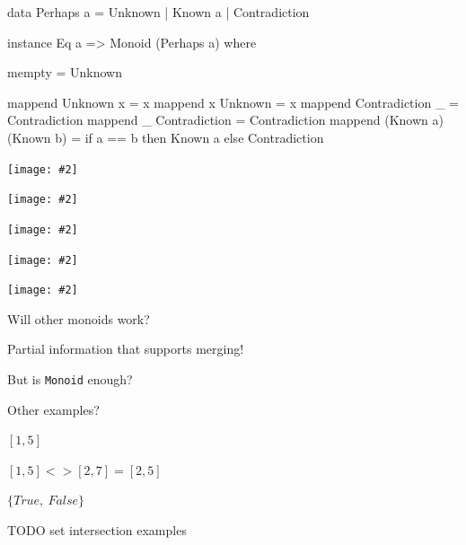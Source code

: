 \documentclass[usenames,dvipsnames,svgnames,table,aspectratio=1610,mathserif]{beamer}
\newcommand{\nl}{\vspace{\baselineskip}}
\newcommand{\pnl}{\pause \nl}
\newcommand{\textslide}[1]{{
\begin{frame}\begin{center}

#1

\end{center}\end{frame}
}}
\newcommand{\imageslide}[2][1]{{
\begin{frame}\begin{center}
\texttt{[image: \#2]}
\end{center}\end{frame}
}}
\newcommand{\imageslideleft}[2][1]{{
\begin{frame}
\texttt{[image: \#2]}
\end{frame}
}}
\begin{document}

\begin{frame}[fragile]

\begin{haskellcode}
data Perhaps a = Unknown | Known a | Contradiction
\end{haskellcode}

\pnl

\begin{haskellcode}
instance Eq a => Monoid (Perhaps a) where

  mempty = Unknown

  mappend Unknown x           = x
  mappend x       Unknown     = x
  mappend Contradiction _     = Contradiction
  mappend _     Contradiction = Contradiction
  mappend (Known a) (Known b) =
    if a == b
      then Known a
      else Contradiction
\end{haskellcode}

\end{frame}



\imageslide[0.6]{diagrams/doubleplus4.pdf}
\imageslide[0.6]{diagrams/doubleplus5.pdf}
\imageslide[0.6]{diagrams/doubleplus6.pdf}
\imageslide[0.6]{diagrams/doubleplus7.pdf}
\imageslide[0.6]{diagrams/doubleplus8.pdf}

\textslide{\LARGE{Will other monoids work?}}


\textslide{
{\LARGE Partial information that supports merging!}

\pnl

But is {\tt Monoid} enough?
}



\textslide{\LARGE Other examples?}

\begin{frame}
\begin{center}
\Huge $[1,5]$
\end{center}
\end{frame}


\begin{frame}
\begin{center}
\Huge $[1, 5] <> [2, 7] = [2,5]$
\end{center}
\end{frame}


\begin{frame}
\begin{center}
\Huge $\{True,\ False\}$
\end{center}
\end{frame}


\begin{frame}
TODO set intersection examples
\end{frame}
\end{document}
